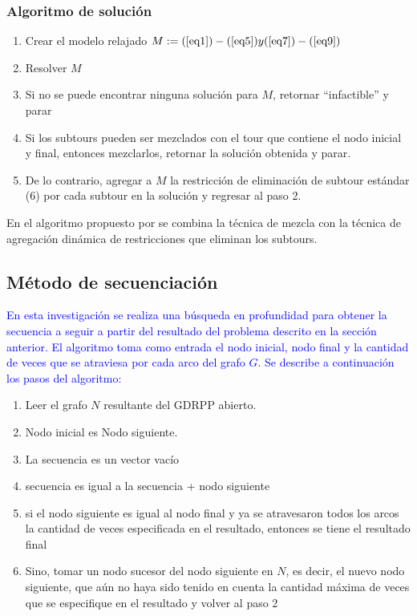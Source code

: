 \documentclass[spanish, conference]{IEEEtran}
\begin{document}
{\subsubsection{Algoritmo de solución}
\begin{enumerate}
\item Crear el modelo relajado $M: = (\ref{eq1}) - (\ref{eq5}) y (\ref{eq7}) - (\ref{eq9})$
\item Resolver $M$
\item Si no se puede encontrar ninguna solución para $M$, retornar ``infactible'' y parar
\item Si los subtours pueden ser mezclados con el tour que contiene el nodo inicial y final, entonces mezclarlos, retornar la solución obtenida y parar.
\item De lo contrario, agregar a $M$ la restricción de eliminación de subtour estándar (6) por cada subtour en la solución y regresar al paso 2.
\end{enumerate}

En el algoritmo propuesto por \cite{Braier2017AnArgentina} se combina la técnica de mezcla con la técnica de agregación dinámica de restricciones que eliminan los subtours.
\subsection{Método de secuenciación}

\textcolor{blue}{En esta investigación se realiza una búsqueda en profundidad para obtener la secuencia a seguir a partir del resultado del problema descrito en la sección anterior. El algoritmo toma como entrada el nodo inicial, nodo final y la cantidad de veces que se atraviesa por cada arco del grafo $G$. Se describe a continuación los pasos del algoritmo:}

\begin{enumerate}
\item Leer el grafo $N$ resultante del GDRPP abierto. 
\item Nodo inicial es Nodo siguiente.
\item La secuencia es un vector vacío
\item secuencia es igual a la secuencia + nodo siguiente
\item si el nodo siguiente es igual al nodo final y ya se atravesaron todos los arcos la cantidad de veces especificada en el resultado, entonces se tiene el resultado final 
\item Sino, tomar un nodo sucesor del nodo siguiente en $N$, es decir, el nuevo nodo siguiente, que aún no haya sido tenido en cuenta la cantidad máxima de veces que se especifique en el resultado y volver al paso 2
\end{enumerate}

}
\end{document}
